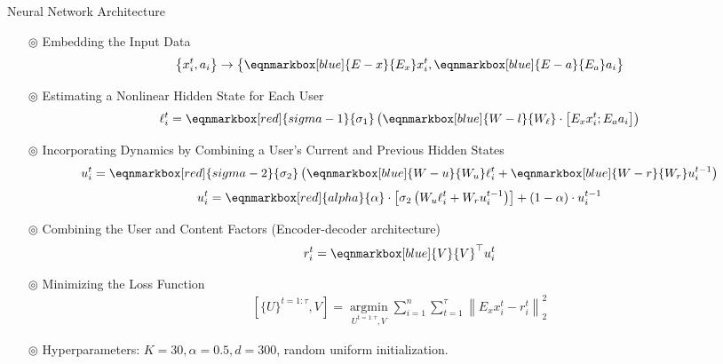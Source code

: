 \documentclass{beamer}
\begin{document}
\begin{frame}[allowframebreaks]{Neural Network Architecture}
	\pagebreak
	\begin{itemize}
		\item[$\circledcirc$] Embedding the Input Data
		      \begin{align*}
			      \left\{x_i^t, a_i\right\} \rightarrow \left\{\eqnmarkbox[blue]{E-x}{E_{x}}x_{i}^{t},\eqnmarkbox[blue]{E-a}{E_{a}}a_{i}\right\}
		      \end{align*}
		\item[$\circledcirc$] Estimating a Nonlinear Hidden State for Each User
		      \begin{align*}
			      \ell_i^t=\eqnmarkbox[red]{sigma-1}{\sigma_1}\left(\eqnmarkbox[blue]{W-l}{W_{\ell}} \cdot\left[E_x x_i^t ; E_a a_i\right]\right)
		      \end{align*}
		      \pagebreak
		\item[$\circledcirc$] Incorporating Dynamics by Combining a User’s Current and Previous Hidden States
		      \begin{align*}
			      u_i^t=\eqnmarkbox[red]{sigma-2}{\sigma_2}\left(\eqnmarkbox[blue]{W-u}{W_{u}}\ell_{i}^{t} + \eqnmarkbox[blue]{W-r}{W_{r}}u_{i}^{t-1}\right)
		      \end{align*}
		      \begin{align*}
			      u_i^t=\eqnmarkbox[red]{alpha}{\alpha} \cdot\left[\sigma_2\left(W_u \ell_i^t+W_r u_i^{t-1}\right)\right]+(1-\alpha) \cdot u_i^{t-1}
		      \end{align*}
		\item[$\circledcirc$] Combining the User and Content Factors (Encoder-decoder architecture)
		      \begin{align*}
			      r_i^t=\eqnmarkbox[blue]{V}{V}^{\top} u_i^t
		      \end{align*}
		\item[$\circledcirc$] Minimizing the Loss Function
		      \begin{align*}
			      \left[\{U\}^{t=1: \tau}, V\right]=\underset{U^{t=1: \tau}, V}{\operatorname{argmin}} \sum_{i=1}^n \sum_{t=1}^\tau\left\|E_x x_i^t-r_i^t\right\|_2^2
		      \end{align*}
		\item[$\circledcirc$] Hyperparameters: $K=30,\alpha=0.5,d=300$, random uniform initialization.
	\end{itemize}


\end{frame}
\end{document}
